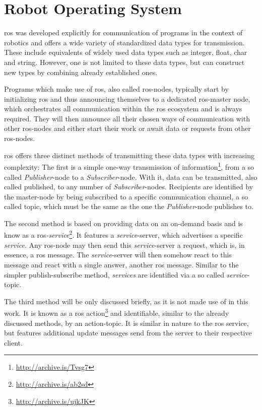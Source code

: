 \section{Robot Operating System}
\label{intro:ros}
\gls{ros} \cite{288} was developed explicitly for communication of programs in the context of robotics and offers a wide variety of standardized data types for transmission.
These include equivalents of widely used data types such as integer, float, char and string.
However, one is not limited to these data types, but can construct new types by combining already established ones.

Programs which make use of \gls{ros}, also called \gls{ros}-nodes, typically start by initializing \gls{ros} and thus announcing themselves to a dedicated \gls{ros}-master node, which orchestrates all communication within the \gls{ros} ecosystem and is always required.
They will then announce all their chosen ways of communication with other \gls{ros}-nodes and either start their work or await data or requests from other \gls{ros}-nodes.

\gls{ros} offers three distinct methods of transmitting these data types with increasing complexity:
The first is a simple one-way transmission of information\footnote{\url{http://archive.is/Tvsg7}}, from a so called \textit{Publisher}-node to a \textit{Subscriber}-node.
With it, data can be transmitted, also called published, to any number of \textit{Subscriber}-nodes.
Recipients are identified by the master-node by being subscribed to a specific communication channel, a so called topic, which must be the same as the one the \textit{Publisher}-node publishes to.

The second method is based on providing data on an on-demand basis and is know as a \gls{ros}\textit{-service}\footnote{\url{http://archive.is/ab2sd}}.
It features a \textit{service}-server, which advertises a specific \textit{service}.
Any \gls{ros}-node may then send this \textit{service}-server a request, which is, in essence, a \gls{ros} message.
The \textit{service}-server will then somehow react to this message and react with a single answer, another \gls{ros} message.
Similar to the simpler publish-subscribe method, \textit{services} are identified via a so called \textit{service}-topic.

The third method will be only discussed briefly, as it is not made use of in this work.
It is known as a \gls{ros} action\footnote{\url{http://archive.is/ujkJK}} and identifiable, similar to the already discussed methods, by an action-topic.
It is similar in nature to the \gls{ros} service, but features additional update messages send from the server to their respective client.

